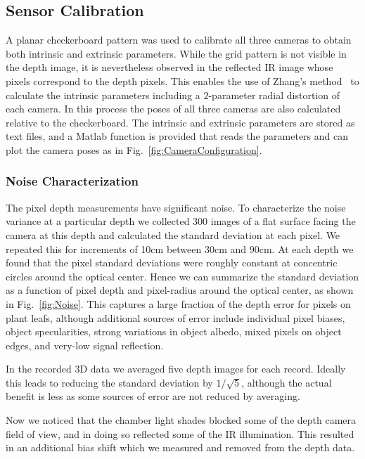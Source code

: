 

\subsection{Sensor Calibration}

A planar checkerboard pattern was used to calibrate all three cameras to obtain both intrinsic and extrinsic parameters.  While the grid pattern is not visible in the depth image, it is nevertheless observed in the reflected IR image whose pixels correspond to the depth pixels.  This enables the use of Zhang's method~\cite{Zhang2000} to calculate the intrinsic parameters including a $2$-parameter radial distortion of each camera.  In this process the poses of all three cameras are also calculated relative to the checkerboard.  The intrinsic and extrinsic parameters are stored as text files, and a Matlab function is provided that reads the parameters and can plot the camera poses as in Fig.~\ref{fig:CameraConfiguration}.


\subsubsection{Noise Characterization}
\label{sec:bias}

The pixel depth measurements have significant noise.  To characterize the noise variance at a particular depth we collected 300 images of a flat surface facing the camera at this depth and calculated the standard deviation at each pixel.  We repeated this for increments of 10cm between 30cm and 90cm.  At each depth we found that the pixel standard deviations were roughly constant at concentric circles around the optical center.  Hence we can summarize the standard deviation as a function of pixel depth and pixel-radius around the optical center, as shown in Fig.~\ref{fig:Noise}.  This captures a large fraction of the depth error for pixels on plant leafs, although additional sources of error include individual pixel biases, object specularities, strong variations in object albedo, mixed pixels on object edges, and very-low signal reflection.  

In the recorded $3$D data we averaged five depth images for each record.  Ideally this leads to reducing the standard deviation by $1/\sqrt{5}$, although the actual benefit is less as some sources of error are not reduced by averaging.

Now we noticed that the chamber light shades blocked some of the depth camera field of view, and in doing so reflected some of the IR illumination.  This resulted in an additional bias shift which we measured and removed from the depth data. %

